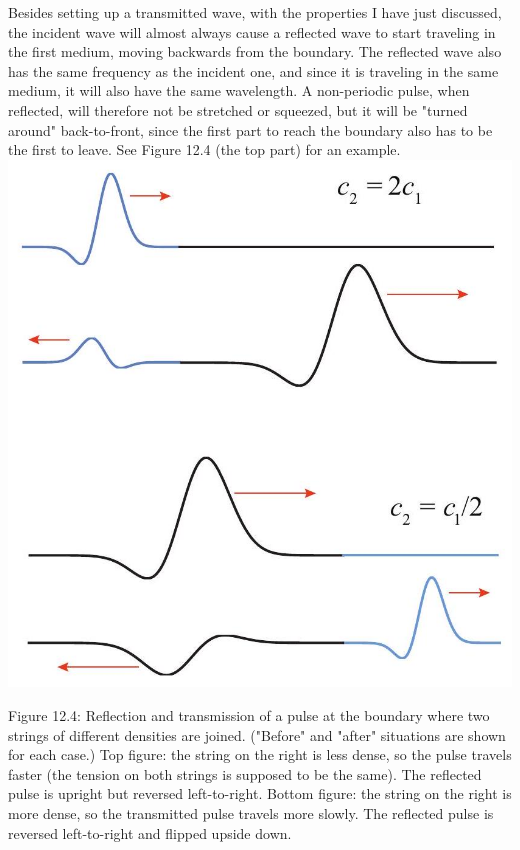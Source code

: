 \documentclass[10pt]{article}
\begin{document}
Besides setting up a transmitted wave, with the properties I have just discussed, the incident wave will almost always cause a reflected wave to start traveling in the first medium, moving backwards from the boundary. The reflected wave also has the same frequency as the incident one, and since it is traveling in the same medium, it will also have the same wavelength. A non-periodic pulse, when reflected, will therefore not be stretched or squeezed, but it will be "turned around" back-to-front, since the first part to reach the boundary also has to be the first to leave. See Figure 12.4 (the top part) for an example.\\
\includegraphics[max width=\textwidth, center]{2024_09_14_9969b06773f10b6936e8g-305}

Figure 12.4: Reflection and transmission of a pulse at the boundary where two strings of different densities are joined. ("Before" and "after" situations are shown for each case.) Top figure: the string on the right is less dense, so the pulse travels faster (the tension on both strings is supposed to be the same). The reflected pulse is upright but reversed left-to-right. Bottom figure: the string on the right is more dense, so the transmitted pulse travels more slowly. The reflected pulse is reversed left-to-right and flipped upside down.
\end{document}
